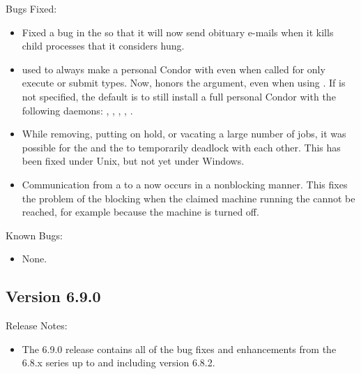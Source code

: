 \noindent Bugs Fixed:

\begin{itemize}

\item Fixed a bug in the  so that it will now send obituary
e-mails when it kills child processes that it considers hung.

\item {} used to always make a personal Condor with
 even when  called for only execute or
submit types.  Now,  honors the 
argument, even when using .
If  is not specified, the default is to still install a
full personal Condor with the following daemons: 
, ,
, , . 

\item While removing, putting on hold, or vacating a large number of
jobs, it was possible for the  and the  to
temporarily deadlock with each other.  This has been fixed under Unix,
but not yet under Windows.

\item Communication from a  to a 
now occurs in a nonblocking manner.
This fixes the problem of the  blocking 
when the claimed machine running the 
cannot be reached, for example because the machine is turned off.

\end{itemize}

\noindent Known Bugs:

\begin{itemize}

\item None.

\end{itemize}

\subsection*{\label{sec:New-6-9-0}Version 6.9.0}

\noindent Release Notes:

\begin{itemize}

\item The 6.9.0 release contains all of the bug fixes and enhancements
  from the 6.8.x series up to and including version 6.8.2.


\end{itemize}


